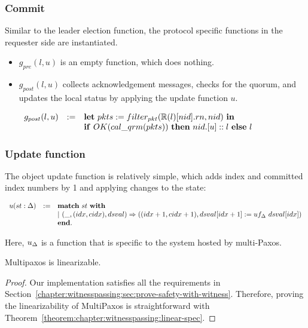 \subsubsection{Commit}
Similar to the leader election function, the protocol specific functions in the requester side are instantiated. 
\begin{itemize}[leftmargin=*]
\item $g_{pre} (l, u)$ is an empty function, which does nothing.
\item $g_{post} (l, u)$ collects acknowledgement messages, checks for the
	quorum, and updates the local status by applying the update function
		$u$.
\begin{center}
$
\begin{array}{lll}
 g_{post} (l, u) &:=&  \mbox{\textbf{let}}\ pkts := filter_{pkt}(\replay(l)[nid].rn, nid) \ \mbox{\textbf{in}}\\
& & \mbox{\textbf{if}} \ OK(cal\_qrm(pkts)) \ \mbox{\textbf{then}} \ nid.[u]::l\ \mbox{\textbf{else}}\ l \\
\end{array}
$
\end{center}
\end{itemize}

\subsubsection{Update function}
The object update function is relatively simple, 
which adds index and committed index numbers by 1 and applying changes to the
state:
\begin{center}
$
\begin{array}{lll}
u (st : \dsvalue)&:=&\mbox{\textbf{match}} \ st \ \mbox{\textbf{with}}\\
& & \vert~(\_, (idx, cidx), dsval)  \Rightarrow ((idx + 1, cidx + 1), dsval[idx + 1] := uf_{\dsvalue}\ dsval[idx])\\
& &  \mbox{\textbf{end}}.\\
\end{array}
$
\end{center}
Here, $u_{\Delta}$ is a function that is specific to the system hosted 
by multi-Paxos.

\begin{theorem}
Multipaxos is  linearizable.
\end{theorem}

\begin{proof}
Our implementation satisfies all the requirements in Section~\ref{chapter:witnesspassing:sec:prove-safety-with-witness}. 
Therefore, proving the linearizability of MultiPaxos is straightforward with Theorem~\ref{theorem:chapter:witnesspassing:linear-spec}.
\end{proof}
